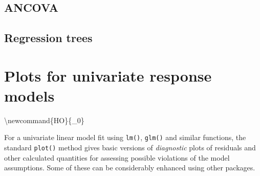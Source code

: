 \documentclass[
  letterpaper,
  10pt,
  krantz2]{krantz}
\begin{document}
{\section{ANCOVA}\label{ancova}

\section{Regression trees}\label{regression-trees}


\chapter{Plots for univariate response
models}\label{sec-linear-models-plots}

\renewcommand*{\vec}[1]{\mathbf{#1}}
\newcommand{\trans}{^\mathsf{T}}
\newcommand*{\mat}[1]{\mathbf{#1}}
\newcommand*{\diag}[1]{\mathrm{diag}\, #1}

\renewcommand*{\det}[1]{\mathrm{det}(#1)}
\newcommand*{\rank}[1]{\mathrm{rank} (\mathbf{#1})}
\newcommand*{\trace}[1]{\mathrm{tr} (\mathbf{#1})}
\newcommand*{\dev}[1]{(#1 - \bar{#1})}
\newcommand*{\inv}[1]{\mat{#1}^{-1}}
\newcommand*{\half}[1]{\mat{#1}^{1/2}}
\newcommand*{\invhalf}[1]{\mat{#1}^{-1/2}}
\newcommand*{\nvec}[2]{{#1}_{1}, {#1}_{2},\ldots,{#1}_{#2}}
\newcommand*{\Beta}{\boldsymbol{B}}
\newcommand*{\Epsilon}{\boldsymbol{\Large\varepsilon}}
\newcommand*{\period}{\:\: .}
\newcommand*{\comma}{\:\: ,}
\newcommand*{\given}{\, | \,}
\newcommand*{\Real}[1]{\mathbb{R}^{#1}}
\newcommand*{\degree}[1]{{#1}^{\circ}}

\newcommand{\sizedmat}[2]{\mathord{\mathop{\mat{#1}}\limits_{#2}}}

\renewcommand*{\H}{\mathbf{H}}               
\newcommand*{\E}{\mathbf{E}}
\newcommand*{\widebar}[1]{\overline{#1}}

\newcommand{\Var}{\mathsf{Var}}
\newcommand{\Cov}{\mathsf{Cov}}

\textbackslash newcommand\{HO\}\{\_0\}

\newcommand*{\V}{\mathcal{V}}

\newcommand{\pkg}[1]{\textsf{#1}}
\newcommand{\Rpackage}[1]{\pkg{#1} package}

For a univariate linear model fit using \texttt{lm()}, \texttt{glm()}
and similar functions, the standard \texttt{plot()} method gives basic
versions of \emph{diagnostic} plots of residuals and other calculated
quantities for assessing possible violations of the model assumptions.
Some of these can be considerably enhanced using other packages.

}
\end{document}
